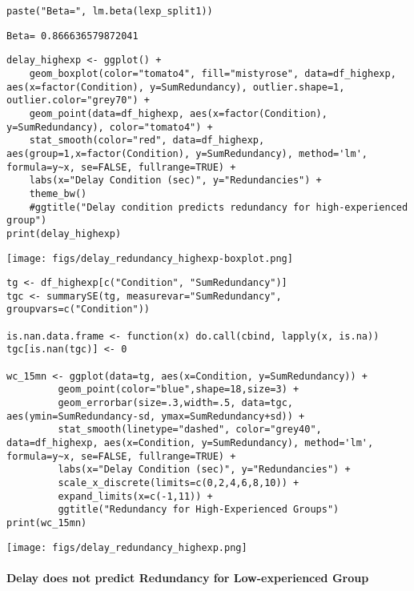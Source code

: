 \documentclass[10pt]{article}
\begin{document}
\begin{verbatim}
paste("Beta=", lm.beta(lexp_split1))
\end{verbatim}

\begin{verbatim}
Beta= 0.866636579872041
\end{verbatim}


\begin{verbatim}
delay_highexp <- ggplot() +
    geom_boxplot(color="tomato4", fill="mistyrose", data=df_highexp, aes(x=factor(Condition), y=SumRedundancy), outlier.shape=1, outlier.color="grey70") +                   
    geom_point(data=df_highexp, aes(x=factor(Condition), y=SumRedundancy), color="tomato4") +
    stat_smooth(color="red", data=df_highexp, aes(group=1,x=factor(Condition), y=SumRedundancy), method='lm', formula=y~x, se=FALSE, fullrange=TRUE) +
    labs(x="Delay Condition (sec)", y="Redundancies") +
    theme_bw()  
    #ggtitle("Delay condition predicts redundancy for high-experienced group")
print(delay_highexp)
\end{verbatim}

\texttt{[image: figs/delay\_redundancy\_highexp-boxplot.png]}



\begin{verbatim}
tg <- df_highexp[c("Condition", "SumRedundancy")]
tgc <- summarySE(tg, measurevar="SumRedundancy", groupvars=c("Condition"))

is.nan.data.frame <- function(x) do.call(cbind, lapply(x, is.na))
tgc[is.nan(tgc)] <- 0

wc_15mn <- ggplot(data=tg, aes(x=Condition, y=SumRedundancy)) +
	     geom_point(color="blue",shape=18,size=3) +
	     geom_errorbar(size=.3,width=.5, data=tgc, aes(ymin=SumRedundancy-sd, ymax=SumRedundancy+sd)) +
	     stat_smooth(linetype="dashed", color="grey40", data=df_highexp, aes(x=Condition, y=SumRedundancy), method='lm', formula=y~x, se=FALSE, fullrange=TRUE) +
	     labs(x="Delay Condition (sec)", y="Redundancies") +
	     scale_x_discrete(limits=c(0,2,4,6,8,10)) +
	     expand_limits(x=c(-1,11)) +
	     ggtitle("Redundancy for High-Experienced Groups")
print(wc_15mn)
\end{verbatim}

\texttt{[image: figs/delay\_redundancy\_highexp.png]}




\paragraph*{Delay does not predict Redundancy for Low-experienced Group}
\label{sec-2-4-2-2}
\end{document}
